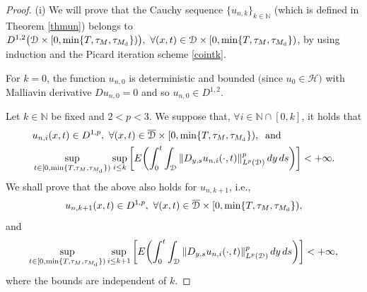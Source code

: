 \documentclass[reqno]{amsart}
\numberwithin{equation}{section}
\newcommand{\mN}{\mathbb{N}}
\newcommand{\cd}{\mathcal{D}}
\newcommand{\ocd}{\overline{\mathcal{D}}}
\newcommand{\ch}{\mathcal{H}}
\begin{document}
\begin{proof} (i) We will prove that the Cauchy sequence
$\{u_{n,k}\}_{k\in\mN}$ (which is defined in Theorem \ref{thmun})
belongs to $ D^{1,2}\bigl(\cd\times[0,\min\{T,\tau_M,\tau_{M_{\rm d}}\})\bigr),\ \forall (x,t)\in \cd\times[0,\min\{T,\tau_M,\tau_{M_{\rm d}}\})$, by using induction and the Picard iteration scheme \eqref{cointk}.

For $k=0$, the function $ u_{n,0} $ is deterministic and bounded $($since $u_0\in\ch)$ with Malliavin derivative $Du_{n,0}=0$ and so $u_{n,0}\in D^{1,2}$.

Let $k\in\mN$ be fixed and $2<p<3. $ We suppose that, $\forall
i\in\mN\cap[0,k]$, it holds that
\begin{equation}
\begin{split}
&u_{n,i}(x,t)\in D^{1,p},\ \forall (x,t)\in\ocd\times[0,\min\{T,\tau_M,\tau_{M_{\rm d}}\}),\;\;\mbox{and}
\\
&\sup_{t\in[0,\min\{T,\tau_M,\tau_{M_{\rm d}}\})} \sup_{i\leq k}
\bigg[E\biggl{(}\int_0^t\int_{\cd}\|D_{y,s}u_{n,i}(\cdot,t)\|_{L^p(\cd)}^p\,dy\,ds\biggr{)}\bigg]<+\infty.
\end{split}
\end{equation}
We shall prove that the above also holds for $u_{n,k+1}$, i.e.,
$$    u_{n,k+1}(x,t)\in D^{1,p},\ \forall
(x,t)\in\ocd\times[0,\min\{T,\tau_M,\tau_{M_{\rm d}}\}),$$ and
$$\sup_{t\in[0,\min\{T,\tau_M,\tau_{M_{\rm d}}\})} \sup_{i\leq
k+1}
\bigg{[}E\biggl{(}\int_0^t\int_{\cd}\|D_{y,s} u_{n,i}(\cdot,t)\|_{L^p(\cd)}^p\,dy\,ds\biggr{)}\bigg{]}<+\infty,$$
where the bounds are independent of $k$.


\end{proof}
\end{document}
